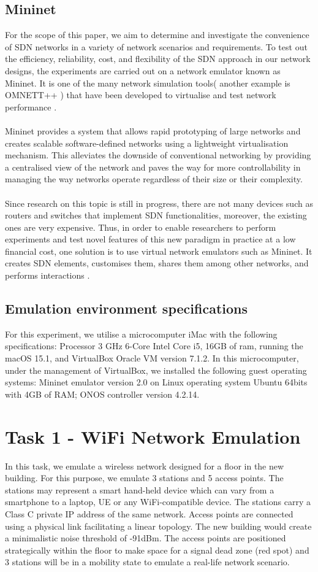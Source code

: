 \documentclass{article}
\begin{document}
\subsection{Mininet}
For the scope of this paper, we aim to determine and investigate the convenience of SDN networks in a variety of network scenarios and requirements. To test out the efficiency, reliability, cost, and flexibility of the SDN approach in our network designs, the experiments are carried out on a network emulator known as Mininet. It is one of the many network simulation tools( another example is OMNETT++ ) that have been developed to virtualise and test network performance \citep{10220519, Haji_Zeebaree_Saeed_Ameen_Shukur_Omar_Sadeeq_Ageed_Ibrahim_Yasin_2021}. \\\\ Mininet \citep{6860404} provides a system that allows rapid prototyping of large networks and creates scalable software-defined networks using a lightweight virtualisation mechanism. This alleviates the downside of conventional networking by providing a centralised view of the network and paves the way for more controllability in managing the way networks operate regardless of their size or their complexity. \\\\
Since research on this topic is still in progress, there are not many devices such as routers and switches that implement SDN functionalities, moreover, the existing ones are very expensive. Thus, in order to enable researchers to perform experiments and test novel features of this new paradigm in practice at a low financial cost, one solution is to use virtual network emulators such as Mininet. It creates SDN elements, customises them, shares them among other networks, and performs interactions \citep{6860404}.
\newpage
\subsection{Emulation environment specifications}
For this experiment, we utilise a microcomputer iMac with the following specifications: Processor 3 GHz 6-Core Intel Core i5, 16GB of ram, running the macOS 15.1, and VirtualBox Oracle VM version 7.1.2.
In this microcomputer, under the management of VirtualBox, we installed the following guest operating systems: Mininet emulator version 2.0 on Linux operating system Ubuntu 64bits with 4GB of RAM; ONOS controller version 4.2.14.
\section{Task 1 - WiFi Network Emulation}
In this task, we emulate a wireless network designed for a floor in the new building. For this purpose, we emulate 3 stations and 5 access points. The stations may represent a smart hand-held device which can vary from a smartphone to a laptop, UE or any WiFi-compatible device. The stations carry a Class C private IP address of the same network. Access points are connected using a physical link facilitating a linear topology. The new building would create a minimalistic noise threshold of -91dBm. The access points are positioned strategically within the floor to make space for a signal dead zone (red spot) and 3 stations will be in a mobility state to emulate a real-life network scenario. 
\end{document}
